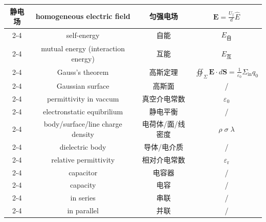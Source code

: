 \documentclass{article}
\begin{document}
\begin{longtable}{|c|c|c|c|}
    \multirow{17}{*}{静电场}
    & homogeneous electric field & 匀强电场 & $\boldsymbol{E}=\frac{U_{\parallel}}{d}\hat{E}$ \\
    \cline{2-4}
    & self-energy & 自能 & $E_{自}$ \\
    \cline{2-4}
    & mutual energy (interaction energy) & 互能 & $E_{互}$ \\
    \cline{2-4}
    & Gauss's theorem & 高斯定理 & $\oiint_{\Sigma}\boldsymbol{E}\cdot d\boldsymbol{S}=\frac{1}{\varepsilon_0}\Sigma_{\text{in}}q_0$ \\
    \cline{2-4}
    & Gaussian surface & 高斯面 & / \\
    \cline{2-4}
    & permittivity in vaccum & 真空介电常数 & $\varepsilon_0$ \\
    \cline{2-4}
    & electronstatic equibrilium & 静电平衡 & / \\
    \cline{2-4}
    & body/surface/line charge density & 电荷体/面/线密度 & $\rho \; \sigma \; \lambda$ \\
    \cline{2-4}
    & dielectric body & 导体/电介质 & / \\
    \cline{2-4}
    & relative permittivity & 相对介电常数 & $\varepsilon_{\text{r}}$ \\
    \cline{2-4}
    & capacitor & 电容器 & / \\
    \cline{2-4}
    & capacity & 电容 & / \\
    \cline{2-4}
    & in series & 串联 & / \\
    \cline{2-4}
    & in parallel & 并联 & / \\
    \hline


\end{longtable}
\end{document}
